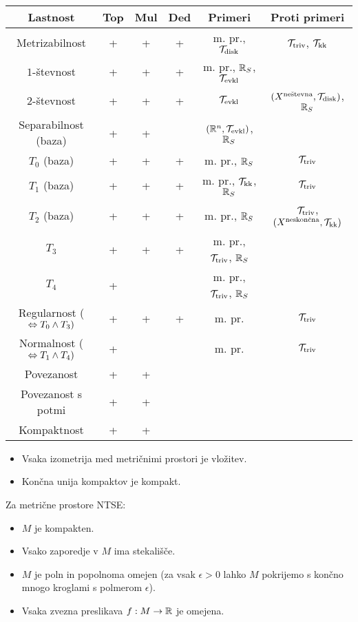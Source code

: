 \begin{center}
    \begin{tabular}{ |c| c |c| c| c| c | }
    \hline
     Lastnost & Top & Mul & Ded & Primeri & Proti primeri\\ \hline
     Metrizabilnost & + & + & + & m. pr., $\mathcal{T}_{\text{disk}}$ & $\mathcal{T}_{\text{triv}}$, $\mathcal{T}_\text{kk}$ \\ \hline
     $1$-števnost & + & + & + & m. pr., $\mathbb{R}_S$, $\mathcal{T}_{\text{evkl}}$ &  \\ \hline
     $2$-števnost & + & + & + & $\mathcal{T}_{\text{evkl}}$ & $(X^\text{neštevna}, \mathcal{T}_{\text{disk}})$, $\mathbb{R}_S$ \\ \hline
     Separabilnost (baza) & + & + &  & $(\mathbb{R}^n, \mathcal{T}_{\text{evkl}})$, $\mathbb{R}_S$ & \\ \hline  
     $T_0$ (baza) & + & + & + & m. pr., $\mathbb{R}_S$ & $\mathcal{T}_{\text{triv}}$ \\ \hline
     $T_1$ (baza) & + & + & + & m. pr., $\mathcal{T}_{\text{kk}}$, $\mathbb{R}_S$ & $\mathcal{T}_{\text{triv}}$ \\ \hline
     $T_2$ (baza) & + & + & + & m. pr., $\mathbb{R}_S$ & $\mathcal{T}_{\text{triv}}$, $(X^\text{neskončna}, \mathcal{T}_{\text{kk}})$ \\ \hline
     $T_3$ & + & + & + & m. pr., $\mathcal{T}_{\text{triv}}$, $\mathbb{R}_S$ &   \\ \hline
     $T_4$ & + & &  & m. pr., $\mathcal{T}_{\text{triv}}$, $\mathbb{R}_S$ &  \\ \hline
     Regularnost (\(\Leftrightarrow T_0 \land T_3)\) & + & + & + & m. pr. & $\mathcal{T}_{\text{triv}}$ \\ \hline
     Normalnost (\(\Leftrightarrow T_1 \land T_4)\)& + & &  & m. pr. & $\mathcal{T}_{\text{triv}}$ \\ \hline
     Povezanost & + & + & & & \\ \hline
     Povezanost s potmi & + & + & & & \\ \hline
     Kompaktnost & + & + & & & \\ \hline
    \end{tabular}
\end{center}

\begin{itemize} 
    \item Vsaka izometrija med metričnimi prostori je vložitev.
    \item Končna unija kompaktov je kompakt.
\end{itemize}

\begin{izrek}
    Za metrične prostore NTSE:
    \begin{itemize}
        \item $M$ je kompakten.
        \item Vsako zaporedje v $M$ ima stekališče.
        \item $M$ je poln in popolnoma omejen (za vsak \(\epsilon > 0\) lahko $M$ pokrijemo s končno mnogo kroglami s polmerom \(\epsilon\)). 
        \item Vsaka zvezna preslikava $f: M \to \mathbb{R}$ je omejena.
    \end{itemize}
\end{izrek}